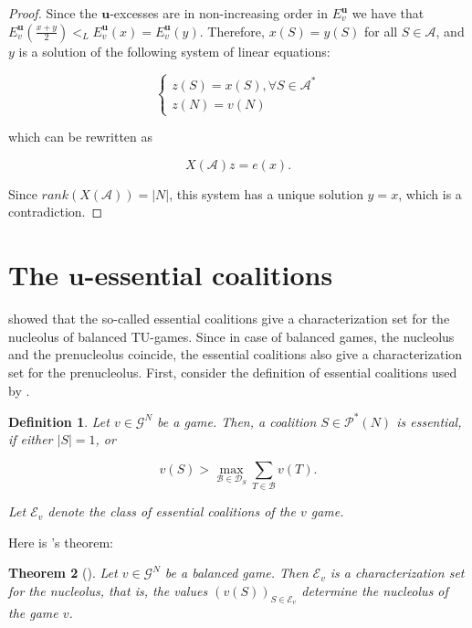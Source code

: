 \documentclass[a4paper,12pt]{article}
\newtheorem{theorem}{Theorem}
\newtheorem{definition}[theorem]{Definition}
\theoremstyle{definition}
\theoremstyle{remark}
\begin{document}
\begin{proof}
Since the $\mathbf{u}$-excesses are in non-increasing order in $E_v^\mathbf{u}$ we have that $E_v^{\mathbf{u}}(\frac{x+y}{2}) <_L E_v^{\mathbf{u}}(x) = E_v^{\mathbf{u}}(y)$. Therefore, $x(S) = y(S)$ for all $S\in \mathcal{A}$, and $y$ is a solution of the following system of linear equations:

\begin{equation}
\begin{cases}
z(S)  = x(S),  \forall S\in \mathcal{A}^* \\
z(N)  = v(N)
\end{cases}
\end{equation}

\noindent which can be rewritten as

\begin{equation*}
X(\mathcal{A})z = e(x).
\end{equation*}

Since $rank(X(\mathcal{A})) = |N|$, this system has a unique solution $y=x$, which is a contradiction.
\end{proof}

\section{The $\mathbf{u}$-essential coalitions}\label{sec:essential}

\citet{Huberman1980} showed that the so-called essential coalitions give a characterization set for the nucleolus of balanced TU-games. Since in case of balanced games, the nucleolus and the prenucleolus coincide, the essential coalitions also give a characterization set for the prenucleolus. First, consider the definition of essential coalitions used by \citet{Huberman1980}. 

\begin{definition}\label{def:ess}
Let $v \in \mathcal{G}^N$ be a game. Then, a coalition $S \in \mathcal{P}^\ast (N)$ is \textit{essential}, if either $|S| = 1$, or 

\begin{equation*}
v(S) > \max \limits_{\mathcal{B} \in \mathcal{D}_S} \sum_{T \in \mathcal{B}} v(T) .
\end{equation*}

Let $\mathcal{E}_v$ denote the class of essential coalitions of the $v$ game.
\end{definition}

Here is \citet{Huberman1980}'s theorem:

\begin{theorem}[\cite{Huberman1980}]\label{th:Huberman}
Let $v \in \mathcal{G}^N$ be a balanced game. Then  $ \mathcal{E}_v$ is a characterization set for the nucleolus, that is, the values $(v (S))_{S \in \mathcal{E}_v}$ determine the nucleolus of the game $v$.
\end{theorem}
\end{document}

